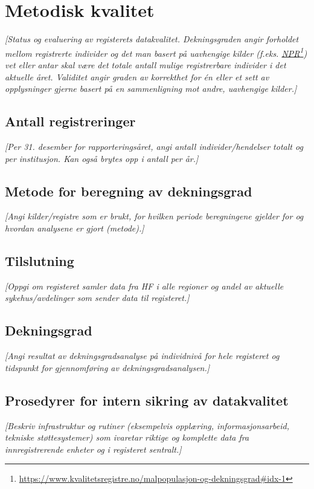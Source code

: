 \documentclass[norsk, a4paper, twocolumn]{report}
\newcommand{\guide}[1] {
	\textit{[\textcolor{guidegray}{#1}]}
	}
\begin{document}
\chapter{Metodisk kvalitet}\label{cha:kva}
\guide{Status og evaluering av registerets  datakvalitet.
Dekningsgraden angir
forholdet mellom registrerte individer og det man basert på uavhengige
kilder (f.eks.
\href{https://www.kvalitetsregistre.no/malpopulasjon-og-dekningsgrad\#idx-1}
{NPR}\footnote{\url{https://www.kvalitetsregistre.no/malpopulasjon-og-dekningsgrad\#idx-1}})
vet eller antar skal være det totale antall mulige registrerbare
individer i det aktuelle året. Validitet angir graden av korrekthet for én eller
et sett av opplysninger gjerne basert på en sammenligning mot andre, uavhengige
kilder.}

\section{Antall registreringer}\label{sec:reg}
\guide{Per 31. desember for rapporteringsåret, angi antall
individer/hendelser totalt og per institusjon. Kan også brytes opp i
antall per år.}

\section{Metode for beregning av dekningsgrad}\label{sec:met}
\guide{Angi kilder/registre som er brukt, for hvilken periode beregningene
gjelder for og hvordan analysene er gjort (metode).}

\section{Tilslutning}\label{sec:endek}
\guide{Oppgi om registeret samler data fra HF i alle regioner og andel
av aktuelle sykehus/avdelinger som sender data til registeret.}

\section{Dekningsgrad}\label{sec:obs}
\guide{Angi resultat av dekningsgradsanalyse på individnivå for hele registeret
og tidspunkt for gjennomføring av dekningsgradsanalysen.}

\section{Prosedyrer for intern sikring av datakvalitet}\label{sec:sik}
\guide{Beskriv infrastruktur og rutiner (eksempelvis
opplæring, informasjonsarbeid, tekniske støttesystemer) som ivaretar
riktige og komplette data fra innregistrerende enheter og i registeret
sentralt.}
\end{document}
